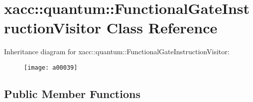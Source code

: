 \hypertarget{a00039}{}\section{xacc\+:\+:quantum\+:\+:Functional\+Gate\+Instruction\+Visitor Class Reference}
\label{a00039}
Inheritance diagram for xacc\+:\+:quantum\+:\+:Functional\+Gate\+Instruction\+Visitor\+:\begin{figure}[H]
\begin{center}
\leavevmode
\texttt{[image: a00039]}
\end{center}
\end{figure}
\subsection*{Public Member Functions}
